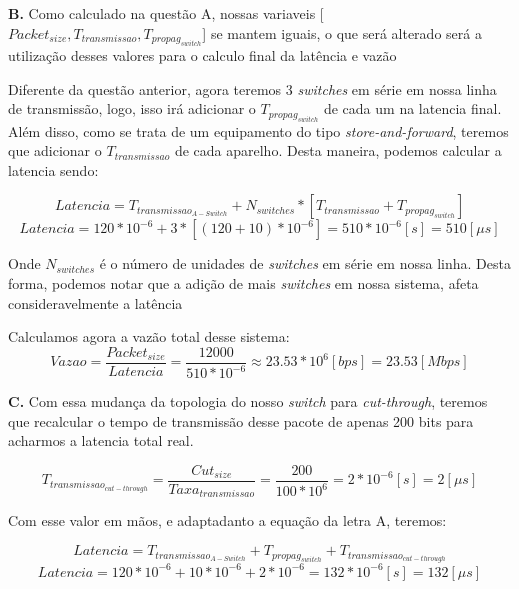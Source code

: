 \textbf{B. }
Como calculado na questão A, nossas variaveis [${Packet_{size}, T_{transmissao}, T_{propag_{switch}}}$] se mantem iguais, o que será alterado será a utilização desses valores para o calculo final da latência e vazão

Diferente da questão anterior, agora teremos 3 \textit{switches} em série em nossa linha de transmissão, logo, isso irá adicionar o ${T_{propag_{switch}}}$ de cada um na latencia final. Além disso, como se trata de um equipamento do tipo \textit{store-and-forward}, teremos que adicionar o $T_{transmissao}$ de cada aparelho. Desta maneira, podemos calcular a latencia sendo:

\begin{equation}
	Latencia = T_{transmissao_{A-Switch}} + N_{switches}*[T_{transmissao} + T_{propag_{switch}}]
\end{equation}
\begin{equation}
	Latencia = 120*10^{-6} + 3*[(120 + 10)*10^{-6}] = 510 * 10^{-6} [s] = 510 [\mu s] 
\end{equation}

Onde $N_{switches}$ é o número de unidades de \textit{switches} em série em nossa linha.
Desta forma, podemos notar que a adição de mais \textit{switches} em nossa sistema, afeta consideravelmente a latência

Calculamos agora a vazão total desse sistema:
\begin{equation}
	Vazao = \frac{Packet_{size}}{Latencia} = \frac{12000}{510 * 10^{-6}} \approx 23.53 * 10^6 [bps] = 23.53 [Mbps]
\end{equation}

\textbf{C. }
Com essa mudança da topologia do nosso \textit{switch} para \textit{cut-through}, teremos que recalcular o tempo de transmissão desse pacote de apenas 200 bits para acharmos a latencia total real.

\begin{equation}
	T_{transmissao_{cut-through}} = \frac{Cut_{size}}{Taxa_{transmissao}} = \frac{200}{100 * 10^6} =  2*10^{-6} [s] = 2 [\mu s]
\end{equation}

Com esse valor em mãos, e adaptadanto a equação da letra A, teremos:

\begin{equation}
	Latencia = T_{transmissao_{A-Switch}} + T_{propag_{switch}} + T_{transmissao_{cut-through}}
\end{equation}
\begin{equation}
	Latencia = 120 * 10^{-6} + 10 * 10^{-6} + 2*10^{-6} = 132 * 10^{-6} [s] = 132 [\mu s]
\end{equation}

